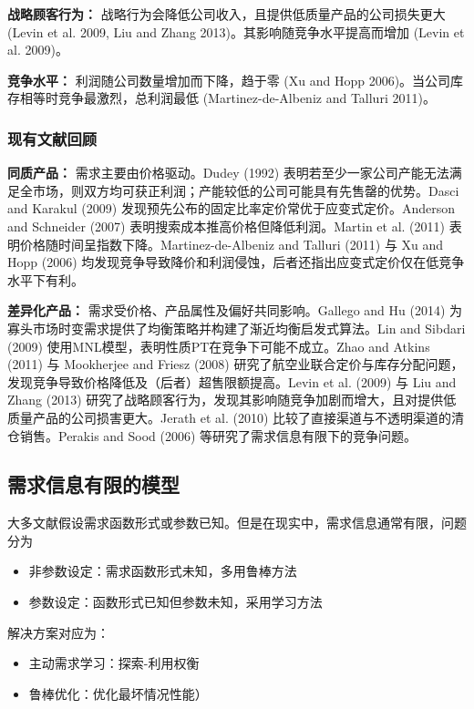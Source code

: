 \textbf{战略顾客行为：} 战略行为会降低公司收入，且提供低质量产品的公司损失更大 (Levin et al. 2009, Liu and Zhang 2013)。其影响随竞争水平提高而增加 (Levin et al. 2009)。

\textbf{竞争水平：} 利润随公司数量增加而下降，趋于零 (Xu and Hopp 2006)。当公司库存相等时竞争最激烈，总利润最低 (Martinez-de-Albeniz and Talluri 2011)。

\subsubsection{现有文献回顾}\label{review-of-existing-literature}

\textbf{同质产品：}
需求主要由价格驱动。Dudey (1992) 表明若至少一家公司产能无法满足全市场，则双方均可获正利润；产能较低的公司可能具有先售罄的优势。Dasci and Karakul (2009) 发现预先公布的固定比率定价常优于应变式定价。Anderson and Schneider (2007) 表明搜索成本推高价格但降低利润。Martin et al. (2011) 表明价格随时间呈指数下降。Martinez-de-Albeniz and Talluri (2011) 与 Xu and Hopp (2006) 均发现竞争导致降价和利润侵蚀，后者还指出应变式定价仅在低竞争水平下有利。

\textbf{差异化产品：}
需求受价格、产品属性及偏好共同影响。Gallego and Hu (2014) 为寡头市场时变需求提供了均衡策略并构建了渐近均衡启发式算法。Lin and Sibdari (2009) 使用MNL模型，表明性质PT在竞争下可能不成立。Zhao and Atkins (2011) 与 Mookherjee and Friesz (2008) 研究了航空业联合定价与库存分配问题，发现竞争导致价格降低及（后者）超售限额提高。Levin et al. (2009) 与 Liu and Zhang (2013) 研究了战略顾客行为，发现其影响随竞争加剧而增大，且对提供低质量产品的公司损害更大。Jerath et al. (2010) 比较了直接渠道与不透明渠道的清仓销售。Perakis and Sood (2006) 等研究了需求信息有限下的竞争问题。

\subsection{需求信息有限的模型}\label{models-with-limited-demand-information}

大多文献假设需求函数形式或参数已知。但是在现实中，需求信息通常有限，问题分为
\begin{itemize}
	\item 非参数设定：需求函数形式未知，多用鲁棒方法
	\item 参数设定：函数形式已知但参数未知，采用学习方法
\end{itemize}

解决方案对应为：
\begin{itemize}
	\item 主动需求学习：探索-利用权衡
	\item 鲁棒优化：优化最坏情况性能）
\end{itemize}


